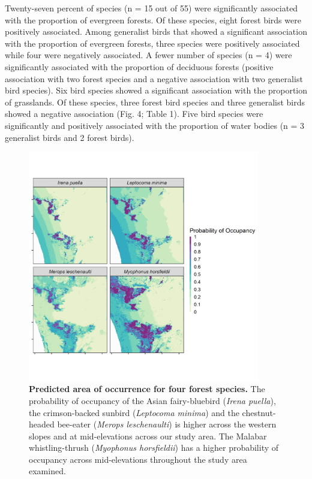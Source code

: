 Twenty-seven percent of species (n = 15 out of 55) were significantly associated with the proportion of evergreen forests.
Of these species, eight forest birds were positively associated.
Among generalist birds that showed a significant association with the proportion of evergreen forests, three species were positively associated while four were negatively associated.
A fewer number of species (n = 4) were significantly associated with the proportion of deciduous forests (positive association with two forest species and a negative association with two generalist bird species).
Six bird species showed a significant association with the proportion of grasslands.
Of these species, three forest bird species and three generalist birds showed a negative association (Fig.
4; Table 1).
Five bird species were significantly and positively associated with the proportion of water bodies (n = 3 generalist birds and 2 forest birds).

\begin{figure}[t!]
    \centering
    \includegraphics[width=0.9\textwidth]{figures/hillybirds/fig_06.png}
    \caption{
        \textbf{Predicted area of occurrence for four forest species.} 
        The probability of occupancy of the Asian fairy-bluebird (\textit{Irena puella}), the crimson-backed sunbird (\textit{Leptocoma minima}) and the chestnut-headed bee-eater (\textit{Merops leschenaulti}) is higher across the western slopes and at mid-elevations across our study area. The Malabar whistling-thrush (\textit{Myophonus horsfieldii}) has a higher probability of occupancy across mid-elevations throughout the study area examined.
    }
    \label{hilly_fig_06}
\end{figure}


